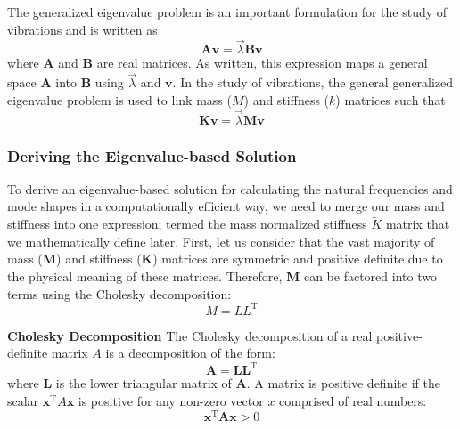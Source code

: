 \documentclass[12pt,letter]{article}
\begin{document}
\begin{review}
		The generalized eigenvalue problem is an important formulation for the study of vibrations and is written as 
		\begin{equation}
			\textbf{A}\textbf{v} = \vec{\lambda}\textbf{B}\textbf{v}
		\end{equation}	
		where $\textbf{A}$ and $\textbf{B}$ are real matrices. As written, this expression maps a general space $\textbf{A}$ into $\textbf{B}$ using $\vec{\lambda}$ and $\textbf{v}$. In the study of vibrations, the general generalized eigenvalue problem is used to link mass ($M$) and stiffness ($k$) matrices such that 
		\begin{equation}
			\textbf{K}\textbf{v} = \vec{\lambda}\textbf{M}\textbf{v}
		\end{equation}		
		
		
	\end{review}	

	
	
	\subsubsection{Deriving the Eigenvalue-based Solution}
	 
	To derive an eigenvalue-based solution for calculating the natural frequencies and mode shapes in a computationally efficient way, we need to merge our mass and stiffness into one expression; termed the  mass normalized stiffness $\widetilde{K}$ matrix that we mathematically define later. First, let us consider that the vast majority of mass ($\textbf{M}$) and stiffness ($\textbf{K}$) matrices are symmetric and positive definite due to the physical meaning of these matrices. Therefore, $\textbf{M}$ can be factored into two terms using the Cholesky decomposition:
		\begin{equation}
			M=LL^{\text{T}}
		\end{equation}
	\begin{review}
	\textbf{Cholesky Decomposition} 
			The Cholesky decomposition of a real positive-definite matrix $A$ is a decomposition of the form:
		\begin{equation}
			\textbf{A}=\textbf{LL}^{\text{T}}
			\end{equation}
		where $\textbf{L}$ is the lower triangular matrix of $\textbf{A}$. 	A matrix is positive definite if the scalar $\textbf{x}^{\text{T}}A\textbf{x}$ is positive for any non-zero vector $x$ comprised of real numbers:
		\begin{equation}
			\textbf{x}^{\text{T}}\textbf{A}\textbf{x} > 0
		\end{equation}
	\end{review}	
\end{document}
